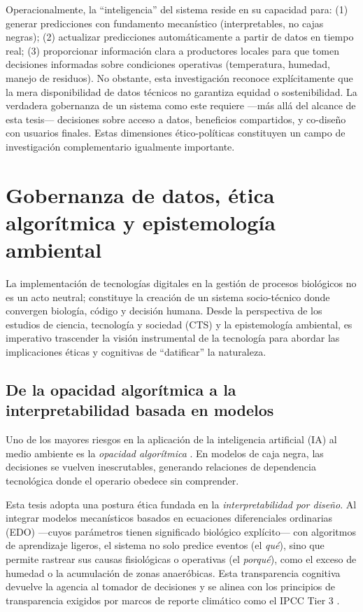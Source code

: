 Operacionalmente, la ``inteligencia'' del sistema reside en su capacidad para: (1) generar 
predicciones con fundamento mecanístico (interpretables, no cajas negras); (2) actualizar 
predicciones automáticamente a partir de datos en tiempo real; (3) proporcionar información 
clara a productores locales para que tomen decisiones informadas sobre condiciones operativas 
(temperatura, humedad, manejo de residuos). No obstante, esta investigación reconoce 
explícitamente que la mera disponibilidad de datos técnicos no garantiza equidad o sostenibilidad. 
La verdadera gobernanza de un sistema como este requiere —más allá del alcance de esta tesis— 
decisiones sobre acceso a datos, beneficios compartidos, y co-diseño con usuarios finales. 
Estas dimensiones ético-políticas constituyen un campo de investigación complementario 
igualmente importante.

\section{Gobernanza de datos, ética algorítmica y epistemología ambiental}

La implementación de tecnologías digitales en la gestión de procesos biológicos no es un acto neutral; constituye la creación de un sistema socio-técnico donde convergen biología, código y decisión humana. Desde la perspectiva de los estudios de ciencia, tecnología y sociedad (CTS) y la epistemología ambiental, es imperativo trascender la visión instrumental de la tecnología para abordar las implicaciones éticas y cognitivas de ``datificar'' la naturaleza.

\subsection{De la opacidad algorítmica a la interpretabilidad basada en modelos}
Uno de los mayores riesgos en la aplicación de la inteligencia artificial (IA) al medio ambiente es la \textit{opacidad algorítmica} \parencite{burrellHowMachineThinks2016}. En modelos de caja negra, las decisiones se vuelven inescrutables, generando relaciones de dependencia tecnológica donde el operario obedece sin comprender.

Esta tesis adopta una postura ética fundada en la \textit{interpretabilidad por diseño}. Al integrar modelos mecanísticos basados en ecuaciones diferenciales ordinarias (EDO) —cuyos parámetros tienen significado biológico explícito— con algoritmos de aprendizaje ligeros, el sistema no solo predice eventos (el \textit{qué}), sino que permite rastrear sus causas fisiológicas o operativas (el \textit{porqué}), como el exceso de humedad o la acumulación de zonas anaeróbicas. Esta transparencia cognitiva devuelve la agencia al tomador de decisiones y se alinea con los principios de transparencia exigidos por marcos de reporte climático como el IPCC Tier 3 \parencite{adadiPeekingBlackBoxSurvey2018}.

